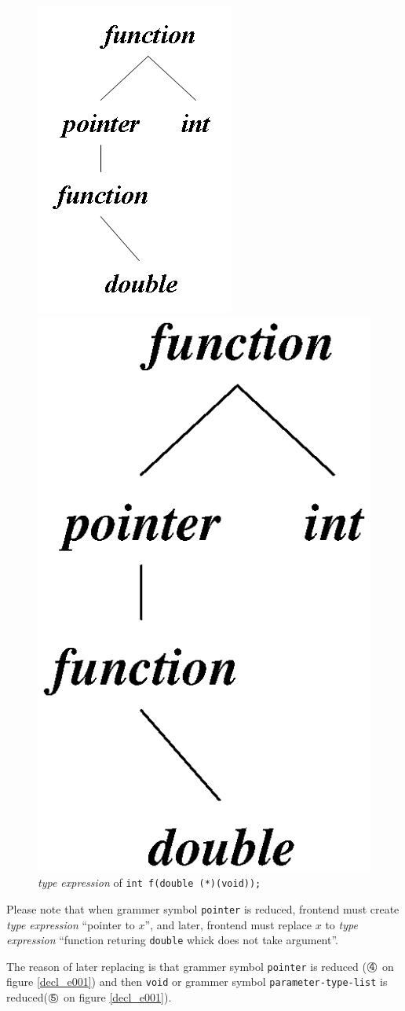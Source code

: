 \begin{figure}[htbp]
\begin{center}
\begin{htmlonly}
\includegraphics[width=0.5\linewidth,height=0.6\linewidth]{decl002.png}
\end{htmlonly} 
\begin{latexonly}
\includegraphics[width=0.5\linewidth,height=0.6\linewidth]{decl002.eps}
\end{latexonly}
\caption{{\em type expression} of {\tt{int f(double (*)(void));}}}
\label{decl_e002}
\end{center}
\end{figure}

Please note that when grammer symbol {\tt{pointer}} is reduced, frontend 
must create {\em type expression} ``pointer to $x$'',
and later, frontend must replace $x$ to {\em type expression} 
``function returing {\tt{double}} whick does not take argument''.

The reason of later replacing is that
grammer symbol {\tt{pointer}} is reduced
 (${\MARU{\tt 4}}$ on figure \ref{decl_e001})
and then {\tt{void}} or grammer symbol {\tt{parameter-type-list}} 
is reduced(${\MARU{\tt 5}}$ on figure \ref{decl_e001}).

